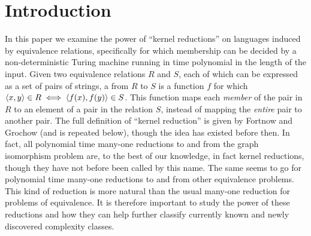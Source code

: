 \section{Introduction}

In this paper we examine the power of ``kernel reductions'' on languages induced by equivalence relations, specifically for which membership can be decided by a non-deterministic Turing machine running in time polynomial in the length of the input.
Given two equivalence relations $R$ and $S$, each of which can be expressed as a set of pairs of strings, a  from $R$ to $S$ is a function $f$ for which $\langle x,y\rangle\in R\iff\langle f(x),f(y)\rangle\in S$.
This function maps each \emph{member} of the pair in $R$ to an element of a pair in the relation $S$, instead of mapping the \emph{entire} pair to another pair.
The full definition of ``kernel reduction'' is given by Fortnow and Grochow \cite{fg11} (and is repeated below), though the idea has existed before then.
In fact, all polynomial time many-one reductions to and from the graph isomorphism problem are, to the best of our knowledge, in fact kernel reductions, though they have not before been called by this name.
The same seems to go for polynomial time many-one reductions to and from other equivalence problems.
This kind of reduction is more natural than the usual many-one reduction for problems of equivalence.
It is therefore important to study the power of these reductions and how they can help further classify currently known and newly discovered complexity classes.
